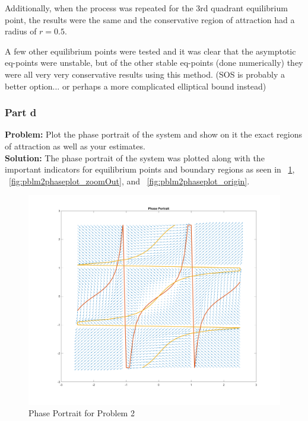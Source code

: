 \documentclass[letter]{article}
\numberwithin{equation}{section}
\begin{document}
Additionally, when the process was repeated for the 3rd quadrant equilibrium point, the results were the same and the conservative region of attraction had a radius of $r=0.5$.

A few other equilibrium points were tested and it was clear that the asymptotic eq-points were unstable, but of the other stable eq-points (done numerically) they were all very very conservative results using this method. (SOS is probably a better option... or perhaps a more complicated elliptical bound instead)

\newpage
\subsubsection{Part d}
\textbf{Problem:}
Plot the phase portrait of the system and show on it the exact regions of attraction as well as your estimates.\\

\noindent
\textbf{Solution:}
The phase portrait of the system was plotted along with the important indicators for equilibrium points and boundary regions as seen in \figurename \ \ref{fig:pblm2phaseplot}, \figurename \ \ref{fig:pblm2phaseplot_zoomOut}, and \figurename \ \ref{fig:pblm2phaseplot_origin}.


\begin{figure}[h]
	\centering
	\includegraphics[width=\linewidth]{fig/pblm2_phaseplot}
	\caption{Phase Portrait for Problem 2}
	\label{fig:pblm2phaseplot}
\end{figure}
\end{document}
